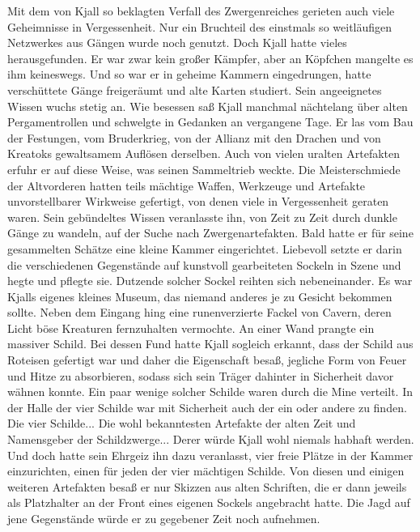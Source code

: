 \documentclass[10pt, a4paper, oneside]{book}
\begin{document}
\begin{multicols}{2}
Mit dem von Kjall so beklagten Verfall des Zwergenreiches gerieten auch viele Geheimnisse in Vergessenheit. Nur ein Bruchteil des einstmals so weitläufigen Netzwerkes aus Gängen wurde noch genutzt. Doch Kjall hatte vieles herausgefunden. Er war zwar kein großer Kämpfer, aber an Köpfchen mangelte es ihm keineswegs. Und so war er in geheime Kammern eingedrungen, hatte verschüttete Gänge freigeräumt und alte Karten studiert. Sein angeeignetes Wissen wuchs stetig an. Wie besessen saß Kjall manchmal nächtelang über alten Pergamentrollen und schwelgte in Gedanken an vergangene Tage. Er las vom Bau der Festungen, vom Bruderkrieg, von der Allianz mit den Drachen und von Kreatoks gewaltsamem Auflösen derselben. Auch von vielen uralten Artefakten erfuhr er auf diese Weise, was seinen Sammeltrieb weckte. Die Meisterschmiede der Altvorderen hatten teils mächtige Waffen, Werkzeuge und Artefakte unvorstellbarer Wirkweise gefertigt, von denen viele in Vergessenheit geraten waren. Sein gebündeltes Wissen veranlasste ihn, von Zeit zu Zeit durch dunkle Gänge zu wandeln, auf der Suche nach Zwergenartefakten. Bald hatte er für seine gesammelten Schätze eine kleine Kammer eingerichtet. Liebevoll setzte er darin die verschiedenen Gegenstände auf kunstvoll gearbeiteten Sockeln in Szene und hegte und pflegte sie. Dutzende solcher Sockel reihten sich nebeneinander. Es war Kjalls eigenes kleines Museum, das niemand anderes je zu Gesicht bekommen sollte. Neben dem Eingang hing eine runenverzierte Fackel von Cavern, deren Licht böse Kreaturen fernzuhalten vermochte. An einer Wand prangte ein massiver Schild. Bei dessen Fund hatte Kjall sogleich erkannt, dass der Schild aus Roteisen gefertigt war und daher die Eigenschaft besaß, jegliche Form von Feuer und Hitze zu absorbieren, sodass sich sein Träger dahinter in Sicherheit davor wähnen konnte. Ein paar wenige solcher Schilde waren durch die Mine verteilt. In der Halle der vier Schilde war mit Sicherheit auch der ein oder andere zu finden. Die vier Schilde... Die wohl bekanntesten Artefakte der alten Zeit und Namensgeber der Schildzwerge... Derer würde Kjall wohl niemals habhaft werden. Und doch hatte sein Ehrgeiz ihn dazu veranlasst, vier freie Plätze in der Kammer einzurichten, einen für jeden der vier mächtigen Schilde. Von diesen und einigen weiteren Artefakten besaß er nur Skizzen aus alten Schriften, die er dann jeweils als Platzhalter an der Front eines eigenen Sockels angebracht hatte. Die Jagd auf jene Gegenstände würde er zu gegebener Zeit noch aufnehmen.\bigskip


\end{multicols}
\end{document}
